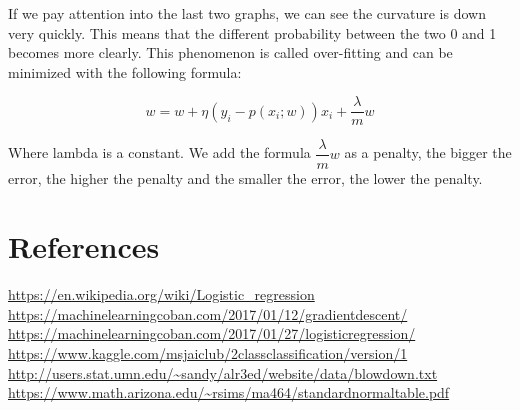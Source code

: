 \documentclass{article}
\begin{document}
If we pay attention into the last two graphs, we can see the curvature is down very quickly. This means that the different probability between the two 0 and 1 becomes more clearly. This phenomenon is called over-fitting and can be minimized with the following formula:

\begin{equation} 
    w = w + \eta(y_{i} - p(x_{i}; w))x_{i} + \dfrac{\lambda}{m} w
\end{equation}

Where lambda is a constant. We add the formula $\dfrac {\lambda} {m} w$ as a penalty, the bigger the error, the higher the penalty and the smaller the error, the lower the penalty.

\section{References}
\url{https://en.wikipedia.org/wiki/Logistic_regression}
\\
\url{https://machinelearningcoban.com/2017/01/12/gradientdescent/}
\\
\url{https://machinelearningcoban.com/2017/01/27/logisticregression/}
\\
\url{https://www.kaggle.com/msjaiclub/2classclassification/version/1}
\\
\url{http://users.stat.umn.edu/~sandy/alr3ed/website/data/blowdown.txt}
\\
\url{https://www.math.arizona.edu/~rsims/ma464/standardnormaltable.pdf}
\end{document}
